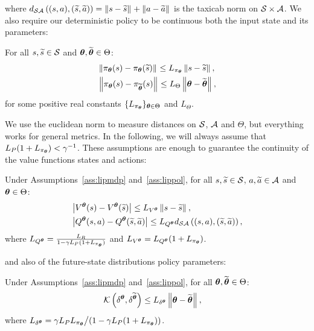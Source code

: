 %
where $d_{\mathcal{S}\mathcal{A}}\left((s,a),(\widetilde{s},\widetilde{a})\right) = \left\|s-\widetilde{s}\right\|_{} + \left\|a-\widetilde{a}\right\|_{}$ is the taxicab norm on $\mathcal{S}\times\mathcal{A}$.
We also require our deterministic policy to be continuous both \wrt the input state and its parameters:
%
\begin{assumption}\label{ass:lippol}
	For all $s,\widetilde{s}\in\mathcal{S}$ and $\boldsymbol{\theta},\widetilde{\boldsymbol{\theta}}\in\Theta$:
	\begin{align}
	&\left\|\pi_{\boldsymbol{\theta}}(s) - \pi_{\boldsymbol{\theta}}(\widetilde{s})\right\|_{} \leq L_{\pi_{\boldsymbol{\theta}}}\left\|s-\widetilde{s}\right\|_{}, \\
	&\left\|\pi_{\boldsymbol{\theta}}(s) - \pi_{\widetilde{\boldsymbol{\theta}}}(s)\right\|_{} \leq L_{\Theta}\left\|\boldsymbol{\theta}-\widetilde{\boldsymbol{\theta}}\right\|_{},
	\end{align}
	for some positive real constants $\{L_{\pi_{\boldsymbol{\theta}}}\}_{\boldsymbol{\theta}\in\Theta}$ and $L_{\Theta}$.
\end{assumption}
%
We use the euclidean norm to measure distances on $\mathcal{S}$, $\mathcal{A}$ and $\Theta$, but everything works for general metrics.
In the following, we will always assume that ${L_{P}(1+L_{\pi_{\boldsymbol{\theta}}}) < \gamma^{-1}}$.
These assumptions are enough to guarantee the continuity of the value functions \wrt states and actions:
%
\begin{lemma}\label{lem:lipval}
	Under Assumptions~\ref{ass:lipmdp} and~\ref{ass:lippol}, for all $s,\widetilde{s}\in\mathcal{S}$, $a,\widetilde{a}\in\mathcal{A}$ and $\boldsymbol{\theta}\in\Theta$:
	\begin{align}
	&\left|V^{\boldsymbol{\theta}}(s) - V^{\boldsymbol{\theta}}(\widetilde{s})\right| \leq L_{V^{\boldsymbol{\theta}}}\left\|s-\widetilde{s}\right\|_{}, \\
	&\left|Q^{\boldsymbol{\theta}}(s,a) - Q^{\boldsymbol{\theta}}(\widetilde{s},\widetilde{a})\right| \leq L_{Q^{\boldsymbol{\theta}}}d_{\mathcal{S}\mathcal{A}}\left((s,a),(\widetilde{s},\widetilde{a})\right),
	\end{align}
	where $L_{Q^{\boldsymbol{\theta}}} = \frac{L_{R}}{1-\gamma L_{P}(1+L_{\pi_{\boldsymbol{\theta}}})}$ and $L_{V^{\boldsymbol{\theta}}} = L_{Q^{\boldsymbol{\theta}}}(1+L_{\pi_{\boldsymbol{\theta}}})$.
\end{lemma}
%
and also of the future-state distributions \wrt policy parameters:
%
\begin{lemma}\label{lem:lipfut}
	Under Assumptions~\ref{ass:lipmdp} and~\ref{ass:lippol}, for all $\boldsymbol{\theta},\widetilde{\boldsymbol{\theta}}\in\Theta$:
	\begin{align}
	&\mathcal{K}\left(\delta^{\boldsymbol{\theta}},\delta^{\widetilde{\boldsymbol{\theta}}}\right) \leq L_{\delta^{\boldsymbol{\theta}}}\left\|\boldsymbol{\theta}-\widetilde{\boldsymbol{\theta}}\right\|_{},
	\end{align}
	where $L_{\delta^{\boldsymbol{\theta}}} = {\gamma L_{P}L_{\pi_{\boldsymbol{\theta}}}}\big/{\left(1-\gamma L_{P}(1+L_{\pi_{\boldsymbol{\theta}}})\right)}$.
\end{lemma}


